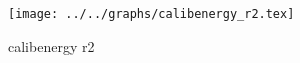 \begin{figure}[h] \centering \texttt{[image: ../../graphs/calibenergy\_r2.tex]}\caption{calibenergy r2}\label{gr:calibenergy_r2} \end{figure}
